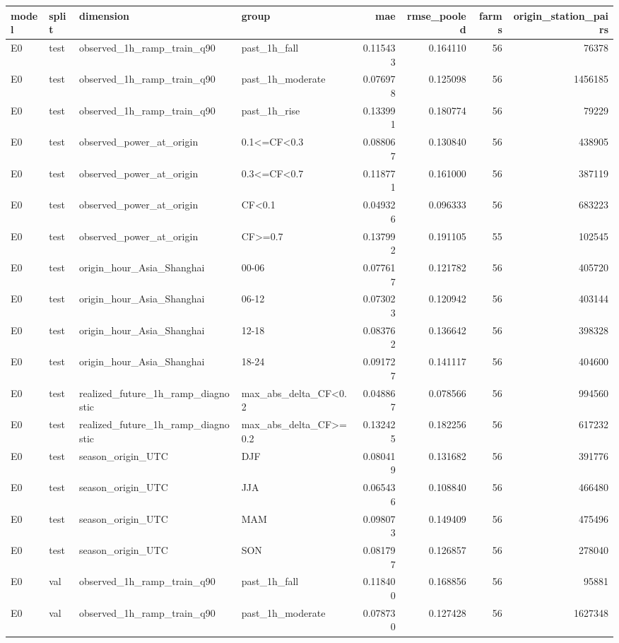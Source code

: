 \begin{tabular}{llllrrrr}
\toprule
model & split & dimension & group & mae & rmse\_pooled & farms & origin\_station\_pairs \\
\midrule
E0 & test & observed\_1h\_ramp\_train\_q90 & past\_1h\_fall & 0.115433 & 0.164110 & 56 & 76378 \\
E0 & test & observed\_1h\_ramp\_train\_q90 & past\_1h\_moderate & 0.076978 & 0.125098 & 56 & 1456185 \\
E0 & test & observed\_1h\_ramp\_train\_q90 & past\_1h\_rise & 0.133991 & 0.180774 & 56 & 79229 \\
E0 & test & observed\_power\_at\_origin & 0.1<=CF<0.3 & 0.088067 & 0.130840 & 56 & 438905 \\
E0 & test & observed\_power\_at\_origin & 0.3<=CF<0.7 & 0.118771 & 0.161000 & 56 & 387119 \\
E0 & test & observed\_power\_at\_origin & CF<0.1 & 0.049326 & 0.096333 & 56 & 683223 \\
E0 & test & observed\_power\_at\_origin & CF>=0.7 & 0.137992 & 0.191105 & 55 & 102545 \\
E0 & test & origin\_hour\_Asia\_Shanghai & 00-06 & 0.077617 & 0.121782 & 56 & 405720 \\
E0 & test & origin\_hour\_Asia\_Shanghai & 06-12 & 0.073023 & 0.120942 & 56 & 403144 \\
E0 & test & origin\_hour\_Asia\_Shanghai & 12-18 & 0.083762 & 0.136642 & 56 & 398328 \\
E0 & test & origin\_hour\_Asia\_Shanghai & 18-24 & 0.091727 & 0.141117 & 56 & 404600 \\
E0 & test & realized\_future\_1h\_ramp\_diagnostic & max\_abs\_delta\_CF<0.2 & 0.048867 & 0.078566 & 56 & 994560 \\
E0 & test & realized\_future\_1h\_ramp\_diagnostic & max\_abs\_delta\_CF>=0.2 & 0.132425 & 0.182256 & 56 & 617232 \\
E0 & test & season\_origin\_UTC & DJF & 0.080419 & 0.131682 & 56 & 391776 \\
E0 & test & season\_origin\_UTC & JJA & 0.065436 & 0.108840 & 56 & 466480 \\
E0 & test & season\_origin\_UTC & MAM & 0.098073 & 0.149409 & 56 & 475496 \\
E0 & test & season\_origin\_UTC & SON & 0.081797 & 0.126857 & 56 & 278040 \\
E0 & val & observed\_1h\_ramp\_train\_q90 & past\_1h\_fall & 0.118400 & 0.168856 & 56 & 95881 \\
E0 & val & observed\_1h\_ramp\_train\_q90 & past\_1h\_moderate & 0.078730 & 0.127428 & 56 & 1627348 \\

\end{tabular}
